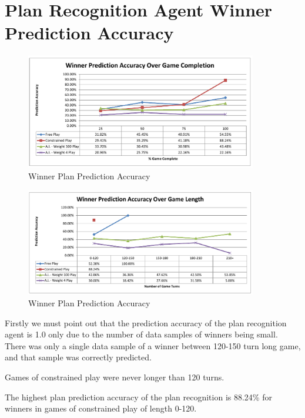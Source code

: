 \documentclass[parskip]{cs4rep}
\begin{document}
\newpage

\section{Plan Recognition Agent Winner Prediction Accuracy}

\begin{figure}[h]
\centerline{
\includegraphics[width=0.9\textwidth]{images/winner-game-complete.pdf}
}
\caption{Winner Plan Prediction Accuracy}
\label{fig:winner-pred-accuracy}
\end{figure} 

\begin{figure}[h]
\centerline{
\includegraphics[width=0.9\textwidth]{images/winner-game-length.pdf}
}
\caption{Winner Plan Prediction Accuracy}
\label{fig:dom-debug-gui}
\end{figure} 

Firstly we must point out that the prediction accuracy of the plan recognition agent is 1.0 only due to the number of data samples of winners being small. There was only a single data sample of a winner between 120-150 turn long game, and that sample was correctly predicted.

Games of constrained play were never longer than 120 turns.

The highest plan prediction accuracy of the plan recognition is 88.24\% for winners in games of constrained play of length 0-120.
\end{document}
